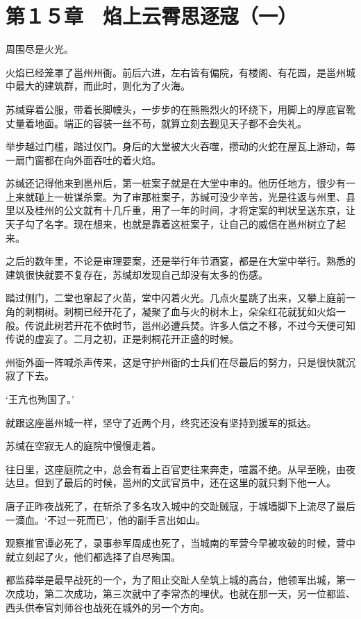 \section{第１５章　焰上云霄思逐寇（一）}

周围尽是火光。

火焰已经笼罩了邕州州衙。前后六进，左右皆有偏院，有楼阁、有花园，是邕州城中最大的建筑群，而此时，则化为了火海。

苏缄穿着公服，带着长脚幞头，一步步的在熊熊烈火的环绕下，用脚上的厚底官靴丈量着地面。端正的容装一丝不苟，就算立刻去觐见天子都不会失礼。

举步越过门槛，踏过仪门。身后的大堂被大火吞噬，攒动的火蛇在屋瓦上游动，每一扇门窗都在向外面吞吐的着火焰。

苏缄还记得他来到邕州后，第一桩案子就是在大堂中审的。他历任地方，很少有一上来就碰上一桩谋杀案。为了审那桩案子，苏缄可没少辛苦，光是往返与州里、县里以及桂州的公文就有十几斤重，用了一年的时间，才将定案的判状呈送东京，让天子勾了名字。现在想来，也就是靠着这桩案子，让自己的威信在邕州树立了起来。

之后的数年里，不论是审理要案，还是举行年节酒宴，都是在大堂中举行。熟悉的建筑很快就要不复存在，苏缄却发现自己却没有太多的伤感。

踏过侧门，二堂也窜起了火苗，堂中闪着火光。几点火星跳了出来，又攀上庭前一角的刺桐树。刺桐已经开花了，凝聚了血与火的树木上，朵朵红花就犹如火焰一般。传说此树若开花不依时节，邕州必遭兵焚。许多人信之不移，不过今天便可知传说的虚妄了。二月之初，正是刺桐花开正盛的时候。

州衙外面一阵喊杀声传来，这是守护州衙的士兵们在尽最后的努力，只是很快就沉寂了下去。

‘王亢也殉国了。’

就跟这座邕州城一样，坚守了近两个月，终究还没有坚持到援军的抵达。

苏缄在空寂无人的庭院中慢慢走着。

往日里，这座庭院之中，总会有着上百官吏往来奔走，喧嚣不绝。从早至晚，由夜达旦。但到了最后的时候，邕州的文武官员中，还在这里的就只剩下他一人。

唐子正昨夜战死了，在斩杀了多名攻入城中的交趾贼寇，于城墙脚下上流尽了最后一滴血。‘不过一死而已’，他的副手言出如山。

观察推官谭必死了，录事参军周成也死了，当城南的军营今早被攻破的时候，营中就立刻起了火，他们都选择了自尽殉国。

都监薛举是最早战死的一个，为了阻止交趾人垒筑上城的高台，他领军出城，第一次成功，第二次成功，第三次就中了李常杰的埋伏。也就在那一天，另一位都监、西头供奉官刘师谷也战死在城外的另一个方向。

